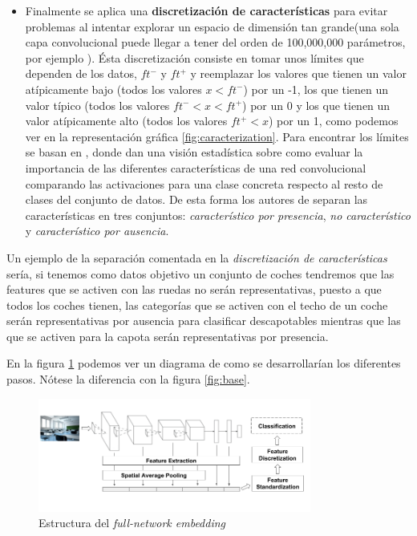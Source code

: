 \documentclass[12,twoside]{TFG-GM}
\theoremstyle{definition}
\theoremstyle{remark}
\begin{document}
\begin{itemize}
\item Finalmente se aplica una \textbf{discretización de características} para evitar problemas al intentar explorar un espacio de dimensión tan grande(una sola capa convolucional puede llegar a tener del orden de 100,000,000 parámetros, por ejemplo \cite{cnnexample}). Ésta discretización consiste en tomar unos límites que dependen de los datos, $ft^-$ y $ft^+$ y reemplazar los valores que tienen un valor atípicamente bajo (todos los valores $x < ft^-$) por un -1, los que tienen un valor típico (todos los valores $ ft^- < x < ft^+$) por un 0 y los que tienen un valor atípicamente alto (todos los valores $ ft^+ < x$) por un 1, como podemos ver en la representación gráfica \ref{fig:caracterization}. Para encontrar los límites se basan en \cite{behaviourcnn}, donde dan una visión estadística sobre como evaluar la importancia de las diferentes características de una red convolucional comparando las activaciones para una clase concreta respecto al resto de clases del conjunto de datos. De esta forma los autores de \cite{behaviourcnn} separan las características en tres conjuntos: \textit{característico por presencia}, \textit{no característico} y \textit{característico por ausencia}.
\end{itemize}

Un ejemplo de la separación comentada en la \textit{discretización de características} sería, si tenemos como datos objetivo un conjunto de coches tendremos que las features que se activen con las ruedas no serán representativas, puesto a que todos los coches tienen, las categorías que se activen con el techo de un coche serán representativas por ausencia para clasificar descapotables mientras que las que se activen para la capota serán representativas por presencia.


En la figura \ref{fig:fnediagram} podemos ver un diagrama de como se desarrollarían los diferentes pasos. Nótese la diferencia con la figura \ref{fig:base}.

\begin{figure}[h]
\label{fig:fne}
\centering
\includegraphics[width = 0.8\textwidth]{Images/cropfne.png} 
\caption{Estructura del \textit{full-network embedding}\label{fig:fnediagram}}
\end{figure}
\end{document}
